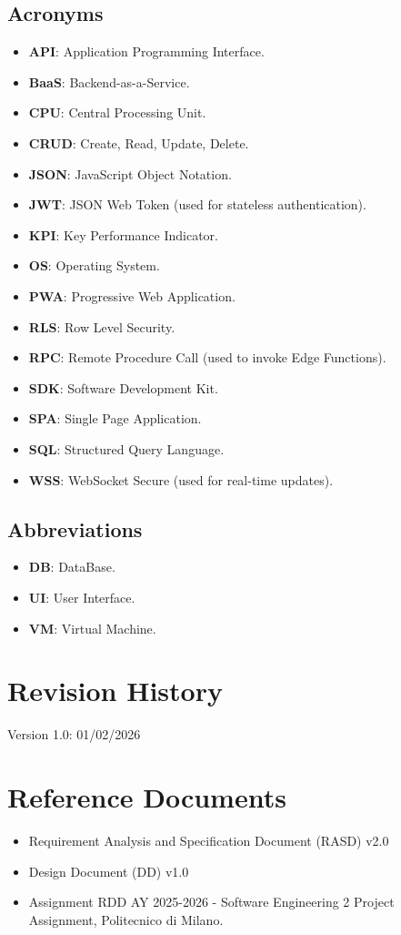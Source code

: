 \subsection{Acronyms}
\begin{itemize}
    \item \textbf{API}: Application Programming Interface.
    \item \textbf{BaaS}: Backend-as-a-Service.
    \item \textbf{CPU}: Central Processing Unit.
    \item \textbf{CRUD}: Create, Read, Update, Delete.
    \item \textbf{JSON}: JavaScript Object Notation.
    \item \textbf{JWT}: JSON Web Token (used for stateless authentication).
    \item \textbf{KPI}: Key Performance Indicator.
    \item \textbf{OS}: Operating System.
    \item \textbf{PWA}: Progressive Web Application.
    \item \textbf{RLS}: Row Level Security.
    \item \textbf{RPC}: Remote Procedure Call (used to invoke Edge Functions).
    \item \textbf{SDK}: Software Development Kit.
    \item \textbf{SPA}: Single Page Application.
    \item \textbf{SQL}: Structured Query Language.
    \item \textbf{WSS}: WebSocket Secure (used for real-time updates).
\end{itemize}

\subsection{Abbreviations}
\begin{itemize}
    \item \textbf{DB}: DataBase.
    \item \textbf{UI}: User Interface.
    \item \textbf{VM}: Virtual Machine.
\end{itemize}

\section{Revision History}
Version 1.0: 01/02/2026

\section{Reference Documents}
\begin{itemize}
    \item Requirement Analysis and Specification Document (RASD) v2.0
    \item Design Document (DD) v1.0
    \item Assignment RDD AY 2025-2026 - Software Engineering 2 Project Assignment, Politecnico di Milano.
\end{itemize}

